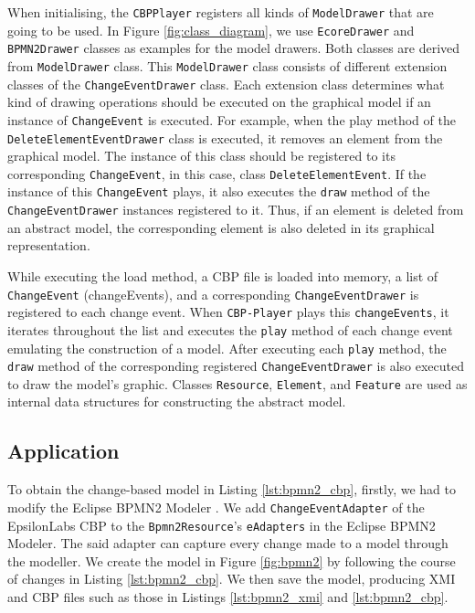 \documentclass[conference]{IEEEtran}
\begin{document}
When initialising, the \texttt{CBPPlayer} registers all kinds of \texttt{ModelDrawer} that are going to be used. 
In Figure \ref{fig:class_diagram}, we use \texttt{EcoreDrawer} and \texttt{BPMN2Drawer} classes as examples for the model drawers. 
Both classes are derived from \texttt{ModelDrawer} class. This \texttt{ModelDrawer} class consists of 
different extension classes of the \texttt{ChangeEventDrawer} class. Each extension class determines
what kind of drawing operations should be executed on the graphical model if an instance of \texttt{ChangeEvent} is executed.
For example, when the play method of the \texttt{DeleteElementEventDrawer} class is executed,
it removes an element from the graphical model. The instance of this class should be registered to
its corresponding \texttt{ChangeEvent}, in this case, class \texttt{DeleteElementEvent}. 
If the instance of this \texttt{ChangeEvent} plays, it also executes the \texttt{draw} method of 
the \texttt{ChangeEventDrawer} instances registered to it. Thus, if an element is deleted from an abstract model,
the corresponding element is also deleted in its graphical representation. 

While executing the load method, a CBP file is loaded into memory,  
a list of \texttt{ChangeEvent} (changeEvents), and a corresponding \texttt{ChangeEventDrawer} is 
registered to each change event. 
When \texttt{CBP-Player} plays this \texttt{changeEvents}, it iterates throughout the list and executes  
the \texttt{play} method of each change event emulating the construction of a model. 
After executing each \texttt{play} method, the \texttt{draw} method of 
the corresponding registered \texttt{ChangeEventDrawer} is also executed to draw the model's graphic.
Classes \texttt{Resource}, \texttt{Element}, and \texttt{Feature} are used as internal data structures 
for constructing the abstract model.

\subsection{Application}
\label{sec:application}
To obtain the change-based model in Listing \ref{lst:bpmn2_cbp}, firstly, we had to modify
the Eclipse BPMN2 Modeler \cite{eclipse2019bpmn2}. We add \texttt{ChangeEventAdapter} \cite{epsilonlabs2019changeeventadapter}
of the EpsilonLabs CBP \cite{DBLP:conf/models/YohannisKP17}  to the \texttt{Bpmn2Resource}'s \texttt{eAdapters}
in the Eclipse BPMN2 Modeler. The said adapter can capture every change made to a model through the modeller.
We create the model in Figure \ref{fig:bpmn2} by following the course of changes in Listing \ref{lst:bpmn2_cbp}.
We then save the model, producing XMI and CBP files such as those 
in Listings \ref{lst:bpmn2_xmi} and \ref{lst:bpmn2_cbp}. 
 
\end{document}
